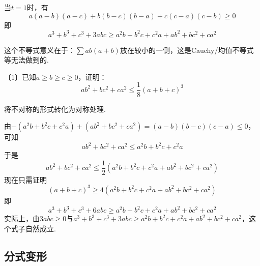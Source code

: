 \documentclass[lang=cn, zihao=4.5]{elegantbook}
\newcommand{\nd}[1]{〔#1〕}
\begin{document}
\begin{corollary}
	当$t=1$时，有$$a(a-b)(a-c) + b(b-c)(b-a) + c(c-a)(c-b) \geq 0$$
	即$$a^3+b^3+c^3+3abc \geq a^2b + b^2c + c^2a + ab^2 + bc^2 + ca^2$$
\end{corollary}
\begin{remark}
	这个不等式意义在于：$\sum ab(a+b)$放在较小的一侧，这是Cauchy/均值不等式等无法做到的.
\end{remark}

\begin{example} %
	\nd{1}已知$a \geq b \geq c \geq 0$，证明：$$ab^2+bc^2+ca^2 \leq \frac{1}{8} (a+b+c)^3$$
\end{example}
\begin{hint}
	将不对称的形式转化为对称处理.
\end{hint}
\begin{solution}
	由$-(a^2b+b^2c+c^2a)+(ab^2+bc^2+ca^2) = (a-b)(b-c)(c-a) \leq 0$，可知$$ab^2+bc^2+ca^2 \leq a^2b+b^2c+c^2a$$
	于是$$ab^2+bc^2+ca^2 \leq \frac{1}{2} (a^2b+b^2c+c^2a+ab^2+bc^2+ca^2)$$
	现在只需证明$$(a+b+c)^3 \geq 4(a^2b+b^2c+c^2a+ab^2+bc^2+ca^2)$$
	即$$a^3+b^3+c^3+6abc \geq a^2b+b^2c+c^2a+ab^2+bc^2+ca^2$$
	实际上，由$3abc \geq 0$与$a^3+b^3+c^3+3abc \geq a^2b + b^2c + c^2a + ab^2 + bc^2 + ca^2$，这个式子自然成立.
\end{solution}


\subsection{分式变形}
\end{document}
